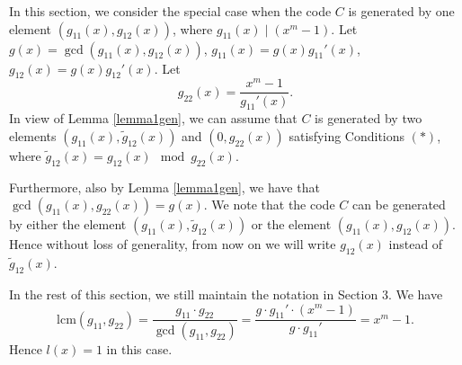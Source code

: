 \documentclass[a4paper,12pt]{article}
\begin{document}
In this section, we consider the   special case  when the code $C$ is generated by one element 
 $(g_{11}(x), g_{12}(x))$, where $g_{11}(x) \mid (x^m-1)$.  Let $g(x)=\gcd(g_{11}(x),g_{12}(x))$,
$g_{11}(x)=g(x)g_{11}'(x)$, $g_{12}(x)=g(x)g_{12}'(x)$. Let 
\[
g_{22}(x) = \dfrac{x^m-1}{g_{11}'(x)}.
\]
In view of Lemma \ref{lemma1gen}, we can assume that $C$ is   generated by two elements $(g_{11}(x), \tilde{g}_{12}(x))$ and $(0, g_{22}(x))$ satisfying Conditions  $(\ast)$, where 
  $\tilde{g}_{12}(x)=g_{12}(x) \mod{g_{22}(x)}$. 


  


Furthermore, also by Lemma \ref{lemma1gen}, we have that  $\gcd(g_{11}(x),g_{22}(x))=g(x)$.  We note that the code $C$ can be generated by either the element  $(g_{11}(x),\tilde{g}_{12}(x))$ or the element  $(g_{11}(x),g_{12}(x))$. Hence without loss of generality, from now on we will write $g_{12}(x)$ instead of $\tilde{g}_{12}(x)$.


In the rest of this section, we still maintain the notation  in Section 3. 
We have
\[
\text{lcm}(g_{11},g_{22}) = \dfrac{g_{11}\cdot g_{22}}{\gcd(g_{11},g_{22})} = \dfrac{g \cdot g_{11}' \cdot (x^m-1)}{g \cdot g_{11}'} = x^m-1.
\]
Hence   $l(x)=1$ in this case.  
\end{document}
